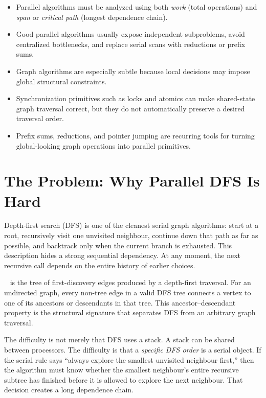 \begin{itemize}
    \item Parallel algorithms must be analyzed using both \emph{work} (total operations) and \emph{span} or \emph{critical path} (longest dependence chain).
    \item Good parallel algorithms usually expose independent subproblems, avoid centralized bottlenecks, and replace serial scans with reductions or prefix sums.
    \item Graph algorithms are especially subtle because local decisions may impose global structural constraints.
    \item Synchronization primitives such as locks and atomics can make shared-state graph traversal correct, but they do not automatically preserve a desired traversal order.
    \item Prefix sums, reductions, and pointer jumping are recurring tools for turning global-looking graph operations into parallel primitives.
\end{itemize}

\section{The Problem: Why Parallel DFS Is Hard}
\label{sec:parallel-dfs-hard}

Depth-first search (DFS) is one of the cleanest serial graph algorithms:
start at a root, recursively visit one unvisited neighbour, continue down that path as far as possible, and backtrack only when the current branch is exhausted.
This description hides a strong sequential dependency.
At any moment, the next recursive call depends on the entire history of earlier choices.

\begin{ppdefn}
\  is the tree of first-discovery edges produced by a depth-first traversal.
For an undirected graph, every non-tree edge in a valid DFS tree connects a vertex to one of its ancestors or descendants in that tree.
This ancestor--descendant property is the structural signature that separates DFS from an arbitrary graph traversal.
\end{ppdefn}

The difficulty is not merely that DFS uses a stack.
A stack can be shared between processors.
The difficulty is that a \emph{specific DFS order} is a serial object.
If the serial rule says ``always explore the smallest unvisited neighbour first,'' then the algorithm must know whether the smallest neighbour's entire recursive subtree has finished before it is allowed to explore the next neighbour.
That decision creates a long dependence chain.

